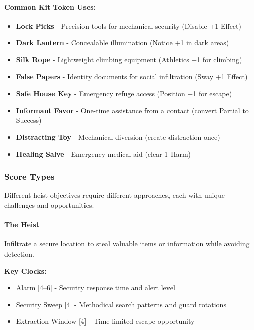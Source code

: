 \documentclass[11pt]{article}
\begin{document}
\paragraph{Common Kit Token Uses:}
\begin{itemize}
    \item \textbf{Lock Picks} - Precision tools for mechanical security (Disable +1 Effect)
    \item \textbf{Dark Lantern} - Concealable illumination (Notice +1 in dark areas)
    \item \textbf{Silk Rope} - Lightweight climbing equipment (Athletics +1 for climbing)
    \item \textbf{False Papers} - Identity documents for social infiltration (Sway +1 Effect)
    \item \textbf{Safe House Key} - Emergency refuge access (Position +1 for escape)
    \item \textbf{Informant Favor} - One-time assistance from a contact (convert Partial to Success)
    \item \textbf{Distracting Toy} - Mechanical diversion (create distraction once)
    \item \textbf{Healing Salve} - Emergency medical aid (clear 1 Harm)
\end{itemize}

\subsubsection{Score Types}

Different heist objectives require different approaches, each with unique challenges and opportunities.

\paragraph{The Heist}

Infiltrate a secure location to steal valuable items or information while avoiding detection.

\textbf{Key Clocks:}
\begin{itemize}
    \item Alarm [4--6] - Security response time and alert level
    \item Security Sweep [4] - Methodical search patterns and guard rotations
    \item Extraction Window [4] - Time-limited escape opportunity
\end{itemize}
\end{document}
